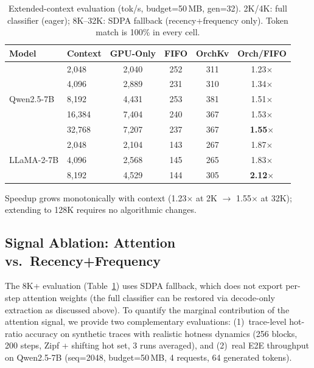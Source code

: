 \documentclass[conference]{IEEEtran}
\begin{document}
\begin{table}[t]
\centering
\caption{Extended-context evaluation (tok/s, budget=50\,MB, gen=32). 2K/4K: full classifier (eager); 8K--32K: SDPA fallback (recency+frequency only). Token match is 100\% in every cell.}
\label{tab:scale}
\footnotesize
\setlength{\tabcolsep}{4pt}
\begin{tabular}{@{}llcccc@{}}
\toprule
Model & Context & GPU-Only & FIFO & OrchKv & Orch/FIFO \\
\midrule
\multirow{5}{*}{Qwen2.5-7B}
& 2{,}048  & 2{,}040 & 252  & 311  & 1.23$\times$ \\
& 4{,}096  & 2{,}889 & 231  & 310  & 1.34$\times$ \\
& 8{,}192  & 4{,}431 & 253  & 381  & 1.51$\times$ \\
& 16{,}384 & 7{,}404 & 240  & 367  & 1.53$\times$ \\
& 32{,}768 & 7{,}207 & 237  & 367  & \textbf{1.55$\times$} \\
\midrule
\multirow{3}{*}{LLaMA-2-7B}
& 2{,}048  & 2{,}104 & 143  & 267  & 1.87$\times$ \\
& 4{,}096  & 2{,}568 & 145  & 265  & 1.83$\times$ \\
& 8{,}192  & 4{,}529 & 144  & 305  & \textbf{2.12$\times$} \\
\bottomrule
\end{tabular}
\end{table}

Speedup grows monotonically with context (1.23$\times$ at 2K $\to$ 1.55$\times$ at 32K); extending to 128K requires no algorithmic changes.

\subsection{Signal Ablation: Attention vs.\ Recency+Frequency}
\label{sec:signal-ablation}

The 8K+ evaluation (Table~\ref{tab:scale}) uses SDPA fallback, which does not export per-step attention weights (the full classifier can be restored via decode-only extraction as discussed above). To quantify the marginal contribution of the attention signal, we provide two complementary evaluations: (1)~trace-level hot-ratio accuracy on synthetic traces with realistic hotness dynamics (256 blocks, 200 steps, Zipf + shifting hot set, 3 runs averaged), and (2)~real E2E throughput on Qwen2.5-7B (seq=2048, budget=50\,MB, 4 requests, 64 generated tokens).
\end{document}
